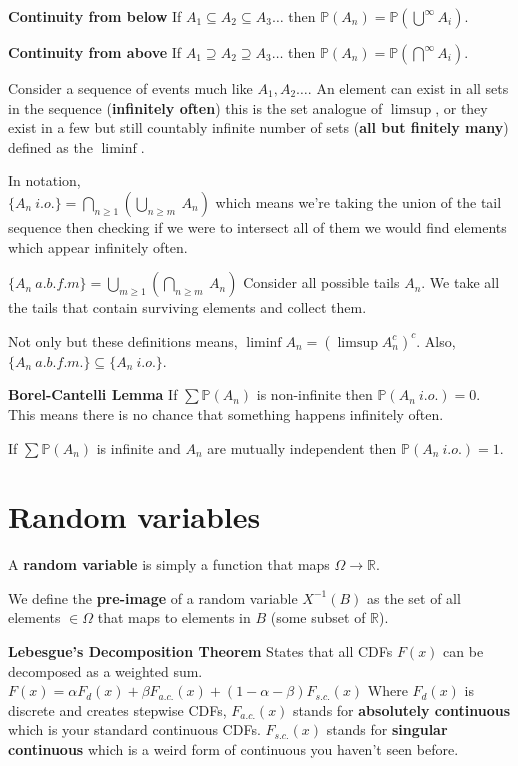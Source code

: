 \documentclass[10pt,landscape,a4paper]{article}
\begin{document}
\begin{multicols*}{4}
\textbf{Continuity from below}
If $A_1 \subseteq A_2 \subseteq A_3 \ldots$
then $\mathbb{P}(A_n) = \mathbb{P}(\bigcup^\infty A_i)$.

\textbf{Continuity from above}
If $A_1 \supseteq A_2 \supseteq A_3 \ldots$
then $\mathbb{P}(A_n) = \mathbb{P}(\bigcap^\infty A_i)$.

Consider a sequence of events much like $A_1, A_2 \ldots$.
An element can exist in all sets in the sequence (\textbf{infinitely often})
this is the set analogue of $\limsup$,
or they exist in a few but still countably infinite number of sets
(\textbf{all but finitely many}) defined as the $\liminf$.

In notation, \\
$\{A_n\ i.o.\} = \bigcap_{n\geq 1}\left(\bigcup_{n \geq m}\ A_n\right)$
which means we're taking the union of the tail sequence then checking if we were
to intersect all of them we would find elements which appear infinitely often.

$\{A_n\ a.b.f.m\} = \bigcup_{m\geq 1}\left(\bigcap_{n\geq m}\ A_n\right)$
Consider all possible tails $A_n$. We take all the tails that contain surviving
elements and collect them.

Not only but these definitions means,
$\liminf A_n = (\limsup A_n^c)^c$. Also, $\{A_n \ a.b.f.m.\} \subseteq \{A_n \ i.o.\}$.

\textbf{Borel-Cantelli Lemma}
If $\sum\mathbb{P}(A_n)$ is non-infinite then $\mathbb{P}(A_n\ i.o.) = 0$.
This means there is no chance that something happens infinitely often.

If $\sum\mathbb{P}(A_n)$ is infinite and $A_n$ are mutually independent then $\mathbb{P}(A_n\ i.o.) = 1$.

\section{Random variables}
A \textbf{random variable} is simply a function that maps $\Omega \to \mathbb{R}$.

We define the \textbf{pre-image} of a random variable $X^{-1}(B)$ as the set of
all elements $\in \Omega$ that maps to elements in $B$ (some subset of $\mathbb{R}$).

\textbf{Lebesgue's Decomposition Theorem}
States that all CDFs $F(x)$ can be decomposed as a weighted sum.
$F(x) = \alpha F_d(x) + \beta F_{a.c.}(x) + (1 - \alpha - \beta)F_{s.c.}(x)$
Where $F_d(x)$ is discrete and creates stepwise CDFs,
$F_{a.c.}(x)$ stands for \textbf{absolutely continuous}
which is your standard continuous CDFs.
$F_{s.c.}(x)$ stands for \textbf{singular continuous}
which is a weird form of continuous you haven't seen before.


\end{multicols*}
\end{document}
